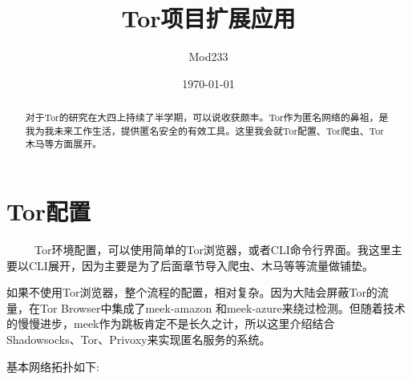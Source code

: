 \documentclass[12pt]{article}  %
\title{Tor项目扩展应用}
\author{Mod233}
\date{\today}
\begin{document}

\maketitle
\begin{abstract}
对于Tor的研究在大四上持续了半学期，可以说收获颇丰。Tor作为匿名网络的鼻祖，是我为我未来工作生活，提供匿名安全的有效工具。这里我会就Tor配置、Tor爬虫、Tor木马等方面展开。
\end{abstract}
\tableofcontents
\section{Tor配置} %
\label{sec:熟悉latex}
\ \ \ \ \ Tor环境配置，可以使用简单的Tor浏览器，或者CLI命令行界面。我这里主要以CLI展开，因为主要是为了后面章节导入爬虫、木马等等流量做铺垫。\par
如果不使用Tor浏览器，整个流程的配置，相对复杂。因为大陆会屏蔽Tor的流量，在Tor Browser中集成了meek-amazon 和meek-azure来绕过检测。但随着技术的慢慢进步，meek作为跳板肯定不是长久之计，所以这里介绍结合 Shadowsocks、Tor、Privoxy来实现匿名服务的系统。 \par
基本网络拓扑如下: \par
\end{document}
